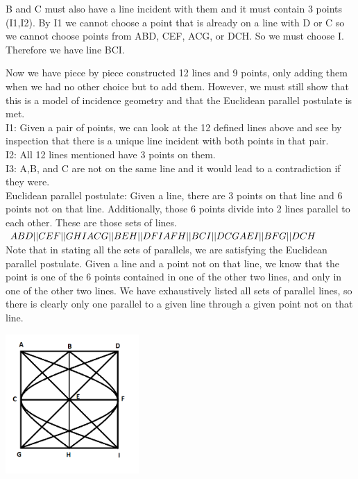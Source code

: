 \documentclass[12pt,letterpaper]{article}
\begin{document}
B and C must also have a line incident with them and it must contain 3 points (I1,I2).  By I1 we cannot choose a point that is already on a line with D or C so we cannot choose points from ABD, CEF, ACG, or DCH.  So we must choose I.  Therefore we have line BCI.\\


\newpage 

Now we have piece by piece constructed 12 lines and 9 points, only adding them when we had no other choice but to add them. However, we must still show that this is a model of incidence geometry and that the Euclidean parallel postulate is met.  \\

\noindent I1: Given a pair of points, we can look at the 12 defined lines above and see by inspection that there is a unique line incident with both points in that pair. \\

\noindent I2: All 12 lines mentioned have 3 points on them.\\

\noindent I3: A,B, and C are not on the same line and it would lead to a contradiction if they were.\\

\noindent Euclidean parallel postulate:  Given a line, there are 3 points on that line and 6 points not on that line.  Additionally, those 6 points divide into 2 lines parallel to each other.  These are those sets of lines.\\

\noindent $ABD || CEF || GHI\\
ACG || BEH || DFI\\
AFH || BCI || DCG\\
AEI || BFG || DCH$\\

Note that in stating all the sets of parallels, we are satisfying the Euclidean parallel postulate.  Given a line and a point not on that line, we know that the point is one of the 6 points contained in one of the other two lines, and only in one of the other two lines.  We have exhaustively listed all sets of parallel lines, so there is clearly only one parallel to a given line through a given point not on that line. 

\includegraphics[width=2in]{lines2.png}
\end{document}
